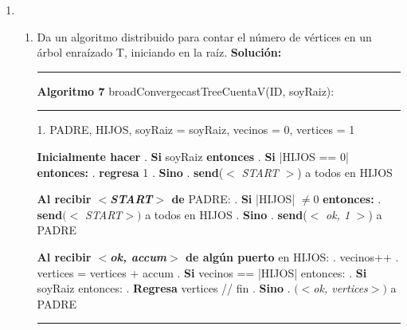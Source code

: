 \documentclass[8pt, letterpaper]{article}
\begin{document}
\begin{enumerate}
  Entonces el total de bits enviados sobre los canales de comunicación, si
  consideramos el reporte final de la raíz, es la suma de todos los
  vertices de las capas $c_i$ con $i\in[0,1,...,d]$, que por definición es
  $|V|$. Si se considera que el algoritmo termina en cuanto la capa 1
  le reporta a la raíz entonces son los vertices en las capas $[1,...,d]$,
  que es $(|V|-1)\cdot k$ bits.
  

  \hfill\break
  \rmfamily
\item
  \begin{enumerate}
  \item Da un algoritmo distribuido para contar el número de vértices en
    un árbol enraízado T, iniciando en la raíz.
    \hfill\break
    \ttfamily
    {\bf Solución:}

  \rule{1\textwidth}{0.2mm}
  {\bf Algoritmo 7} broadConvergecastTreeCuentaV(ID, soyRaiz):
  \hfill\break
  \rule{1\textwidth}{0.2mm}
  1. PADRE, HIJOS, soyRaiz = soyRaiz, vecinos = 0, vertices = 1
  
  \hfill\break
  \hspace*{.2cm} {\bf Inicialmente hacer}
  \hfill{}. {\bf Si} soyRaiz {\bf entonces}
  \hfill{}. \hspace{0.5cm} {\bf Si} |HIJOS == 0| {\bf entonces:}
  \hfill{}. \hspace{1cm} {\bf regresa} 1
  \hfill{}. \hspace{0.5cm} {\bf Sino}
  \hfill{}. \hspace{1cm} {\bf send}($<$ \textit{START} $>$) a todos en HIJOS
  \hfill\break
  
  \hspace{0.2cm} {\bf Al recibir $<${\it START}$>$ de } PADRE:
  \hfill{}. {\bf Si} |HIJOS| $\neq 0$ {\bf entonces:}
  \hfill{}. \hspace{.5cm} {\bf send}$(<$ {\it START}$>)$ a todos en HIJOS
  \hfill{}. {\bf Sino} 
  \hfill{}. \hspace{1cm} {\bf send}($<$ \textit{ok, 1} $>$) a PADRE
  \hfill\break

  \hspace{0.2cm} {\bf Al recibir $<${\it ok, accum}$>$ de algún puerto} en HIJOS:
  \hfill{}. vecinos++
  \hfill{}. vertices = vertices + accum
  \hfill{}. {\bf Si} vecinos == |HIJOS| entonces:
  \hfill{}.\hspace{0.5cm} {\bf Si} soyRaiz entonces:
  \hfill{}.\hspace{1cm} {\bf Regresa} vertices // fin
  \hfill{}.\hspace{0.5cm} {\bf Sino}
  \hfill{}. \hspace{1cm}{\bf send}$(<${\it ok, vertices}$>)$ a PADRE
  \hfill\break
  \rule{1\textwidth}{0.2mm}


\end{enumerate}
\end{enumerate}
\end{document}
